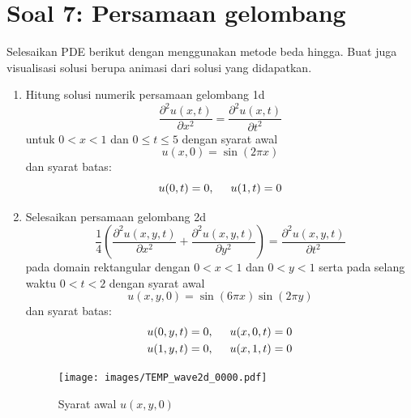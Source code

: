 \documentclass[12pt,bahasa]{article}
\begin{document}
\section{Soal 7: Persamaan gelombang}

Selesaikan PDE berikut dengan menggunakan metode beda hingga.
Buat juga visualisasi solusi berupa animasi dari solusi yang didapatkan.

\begin{enumerate}[label=(\alph*)]
%
\item Hitung solusi numerik persamaan gelombang 1d
\begin{equation}
\frac{\partial^2 u(x,t)}{\partial x^2} = \frac{\partial^2 u(x,t)}{\partial t^2}
\end{equation}
untuk $0 < x < 1$ dan $0 \leq t \leq 5$ dengan syarat awal
\begin{equation*}
u(x,0) = \sin\left(2\pi x\right)
\end{equation*}
dan syarat batas:
\begin{equation*}
u(0,t) = 0, \hspace{0.5cm} u(1,t) = 0
\end{equation*}
%
\item Selesaikan persamaan gelombang 2d
\begin{equation}
\frac{1}{4}\left(\frac{\partial^2 u(x,y,t)}{\partial x^2} +
\frac{\partial^2 u(x,y,t)}{\partial y^2}\right)
= \frac{\partial^2 u(x,y,t)}{\partial t^2}
\end{equation}
pada domain rektangular dengan $0 < x < 1$ dan $0 < y < 1$ serta
pada selang waktu $0 < t < 2$ dengan syarat awal
\begin{equation*}
u(x,y,0) = \sin(6\pi x)\sin(2\pi y)
\end{equation*}
dan syarat batas:
\begin{align*}
u(0,y,t) = 0, \hspace{0.5cm} u(x,0,t) = 0 \\
u(1,y,t) = 0, \hspace{0.5cm} u(x,1,t) = 0
\end{align*}

\begin{figure}[H]
\centering
\texttt{[image: images/TEMP\_wave2d\_0000.pdf]}
\par
\caption{Syarat awal $u(x,y,0)$}
\end{figure}
%
\end{enumerate}


%
%
%
%
%
%
%
\end{document}

